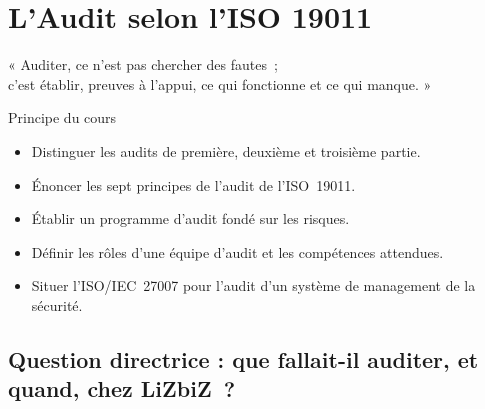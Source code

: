 
\chapter{L'Audit selon l'ISO 19011}
\label{chap:audit}

\epigraph{%
    « Auditer, ce n'est pas chercher des fautes~;\\
    c'est établir, preuves à l'appui, ce qui fonctionne et ce qui manque. »%
}{Principe du cours}


\begin{boxobjectifs}
\begin{itemize}
    \item Distinguer les audits de première, deuxième et troisième partie.
    \item Énoncer les sept principes de l'audit de l'ISO~19011.
    \item Établir un programme d'audit fondé sur les risques.
    \item Définir les rôles d'une équipe d'audit et les compétences
          attendues.
    \item Situer l'ISO/IEC~27007 pour l'audit d'un système de management de
          la sécurité.
\end{itemize}
\end{boxobjectifs}

\bigskip

\section*{Question directrice : que fallait-il auditer, et quand, chez LiZbiZ~?}

